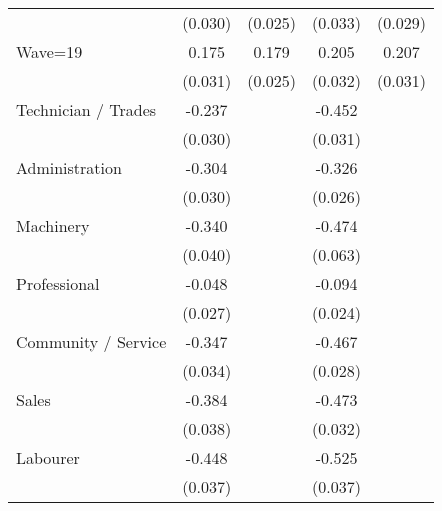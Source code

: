 {\begin{tabular}{l*{4}{c}}
                    &     (0.030)         &     (0.025)         &     (0.033)         &     (0.029)         \\
[1em]
Wave=19             &       0.175\sym{***}&       0.179\sym{***}&       0.205\sym{***}&       0.207\sym{***}\\
                    &     (0.031)         &     (0.025)         &     (0.032)         &     (0.031)         \\
[1em]
Technician / Trades &      -0.237\sym{***}&                     &      -0.452\sym{***}&                     \\
                    &     (0.030)         &                     &     (0.031)         &                     \\
[1em]
Administration      &      -0.304\sym{***}&                     &      -0.326\sym{***}&                     \\
                    &     (0.030)         &                     &     (0.026)         &                     \\
[1em]
Machinery           &      -0.340\sym{***}&                     &      -0.474\sym{***}&                     \\
                    &     (0.040)         &                     &     (0.063)         &                     \\
[1em]
Professional        &      -0.048         &                     &      -0.094\sym{***}&                     \\
                    &     (0.027)         &                     &     (0.024)         &                     \\
[1em]
Community / Service &      -0.347\sym{***}&                     &      -0.467\sym{***}&                     \\
                    &     (0.034)         &                     &     (0.028)         &                     \\
[1em]
Sales               &      -0.384\sym{***}&                     &      -0.473\sym{***}&                     \\
                    &     (0.038)         &                     &     (0.032)         &                     \\
[1em]
Labourer            &      -0.448\sym{***}&                     &      -0.525\sym{***}&                     \\
                    &     (0.037)         &                     &     (0.037)         &                     \\

\end{tabular}}
